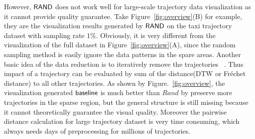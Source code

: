 However, $\mathsf{RAND}$ does not work well for large-scale trajectory data visualization as it cannot provide quality guarantee. Take Figure~\ref{fig:overview}(B) for example, they are the visualization results generated by $\mathsf{RAND}$ on the \pt{} taxi trajectory dataset with sampling rate  $1\%$. Obviously, it is very different from the visualization of the full \pt{} dataset in Figure~\ref{fig:overview}(A), since the random sampling method is easily ignore the data patterns in the spare areas. Another basic idea of the data reduction is to iteratively remove the trajectories ~\cite{borcan2012improving}. Thus impact of a trajectory can be evaluated by sum of the distance(DTW or Fréchet distance) to all other trajectories. As shown by Figure.~\ref{fig:overview}, the visualization generated $\mathsf{baseline}$ is much better than $Rand$ by preserve more trajectories in the sparse region, but the general structure is still missing because it cannot theoretically guarantee the visual quality. Moreover the pairwise distance calculation for large trajectory dataset is very time consuming, which always needs days of preprocessing for millions of trajectories. 



